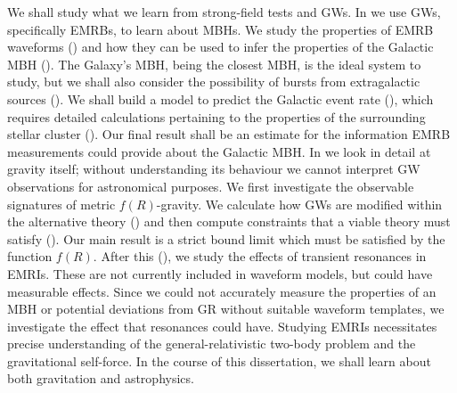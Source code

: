 We shall study what we learn from strong-field tests and GWs. In  we use GWs, specifically EMRBs, to learn about MBHs. We study the properties of EMRB waveforms () and how they can be used to infer the properties of the Galactic MBH (). The Galaxy's MBH, being the closest MBH, is the ideal system to study, but we shall also consider the possibility of bursts from extragalactic sources (). We shall build a model to predict the Galactic event rate (), which requires detailed calculations pertaining to the properties of the surrounding stellar cluster (). Our final result shall be an estimate for the information EMRB measurements could provide about the Galactic MBH. In  we look in detail at gravity itself; without understanding its behaviour we cannot interpret GW observations for astronomical purposes. We first investigate the observable signatures of metric $f(R)$-gravity. We calculate how GWs are modified within the alternative theory () and then compute constraints that a viable theory must satisfy (). Our main result is a strict bound limit which must be satisfied by the function $f(R)$. After this (), we study the effects of transient resonances in EMRIs. These are not currently included in waveform models, but could have measurable effects. Since we could not accurately measure the properties of an MBH or potential deviations from GR without suitable waveform templates, we investigate the effect that resonances could have. Studying EMRIs necessitates precise understanding of the general-relativistic two-body problem and the gravitational self-force. In the course of this dissertation, we shall learn about both gravitation and astrophysics.
